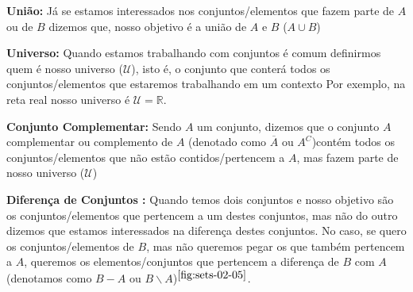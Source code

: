     \textbf{União:} Já se estamos interessados nos conjuntos/elementos que fazem parte de $A$ ou de $B$ dizemos que, nosso objetivo é a união de $A$ e $B$ ($A \cup B$)%
    
    
    \textbf{Universo:} Quando estamos trabalhando com conjuntos é comum definirmos quem é nosso universo ($ \mathcal U $), isto é, o conjunto que conterá todos os conjuntos/elementos que estaremos trabalhando em um contexto%
    Por exemplo, na reta real nosso universo é $\mathcal U = \mathbb{R}$.
    
    
    \textbf{Conjunto Complementar:} Sendo $A$ um conjunto, dizemos que o conjunto $A$ complementar ou complemento de $A$ (denotado como $\overline A$ ou $A^C$)contém todos os conjuntos/elementos que não estão contidos/pertencem a $A$, mas fazem parte de nosso universo ($\mathcal U$)%
    
    
    \textbf{Diferença de Conjuntos :} Quando temos dois conjuntos e nosso objetivo são os conjuntos/elementos que pertencem a um destes conjuntos, mas não do outro dizemos que estamos interessados na diferença destes conjuntos. No caso, se quero os conjuntos/elementos de $B$, mas não queremos pegar os que também pertencem a $A$, queremos os elementos/conjuntos que pertencem a diferença de $B$ com $A$ (denotamos como $B-A$ ou $B \backslash A$)$^{\ref{fig:sets-02-05}}$.
    
